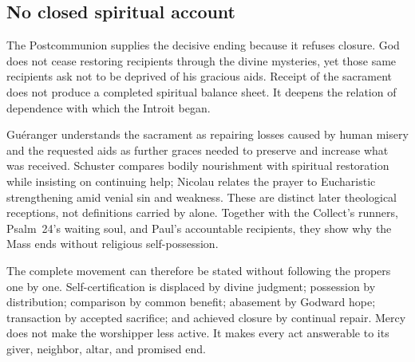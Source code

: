\subsection*{No closed spiritual account}

The Postcommunion supplies the decisive ending because it refuses closure.
God does not cease restoring recipients through the divine mysteries, yet
those same recipients ask not to be deprived of his gracious aids.  Receipt
of the sacrament does not produce a completed spiritual balance sheet.  It
deepens the relation of dependence with which the Introit began.

Guéranger understands the sacrament as repairing losses caused by human
misery and the requested aids as further graces needed to preserve and
increase what was received.  Schuster compares bodily nourishment with
spiritual restoration while insisting on continuing help; Nicolau relates the
prayer to Eucharistic strengthening amid venial sin and weakness.  These are
distinct later theological receptions, not definitions carried by
 alone.  Together with the Collect's runners, Psalm~24's
waiting soul, and Paul's accountable recipients, they show why the Mass ends
without religious self-possession.

The complete movement can therefore be stated without following the propers
one by one.  Self-certification is displaced by divine judgment; possession
by distribution; comparison by common benefit; abasement by Godward hope;
transaction by accepted sacrifice; and achieved closure by continual repair.
Mercy does not make the worshipper less active.  It makes every act
answerable to its giver, neighbor, altar, and promised end.
